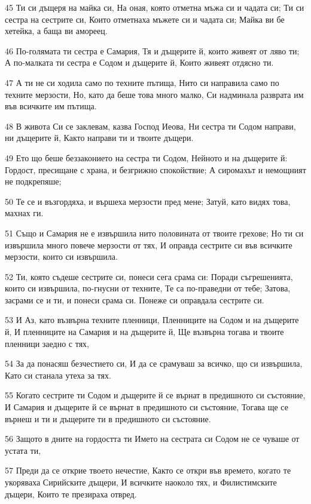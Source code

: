 \par 45 Ти си дъщеря на майка си, На оная, която отметна мъжа си и чадата си; Ти си сестра на сестрите си, Които отметнаха мъжете си и чадата си; Майка ви бе хетейка, а баща ви амореец.
\par 46 По-голямата ти сестра е Самария, Тя и дъщерите й, които живеят от ляво ти; А по-малката ти сестра е Содом и дъщерите й, Които живеят отдясно ти.
\par 47 А ти не си ходила само по техните пътища, Нито си направила само по техните мерзости, Но, като да беше това много малко, Си надминала разврата им във всичките им пътища.
\par 48 В живота Си се заклевам, казва Господ Иеова, Ни сестра ти Содом направи, ни дъщерите й, Както направи ти и твоите дъщери.
\par 49 Ето що беше беззаконието на сестра ти Содом, Нейното и на дъщерите й: Гордост, пресищане с храна, и безгрижно спокойствие; А сиромахът и немощният не подкрепяше;
\par 50 Те се и възгордяха, и вършеха мерзости пред мене; Затуй, като видях това, махнах ги.
\par 51 Също и Самария не е извършила нито половината от твоите грехове; Но ти си извършила много повече мерзости от тях, И оправда сестрите си във всичките мерзости, които си извършила.
\par 52 Ти, която съдеше сестрите си, понеси сега срама си: Поради съгрешенията, които си извършила, по-гнусни от техните, Те са по-праведни от тебе; Затова, засрами се и ти, и понеси срама си. Понеже си оправдала сестрите си.
\par 53 И Аз, като възвърна техните пленници, Пленниците на Содом и на дъщерите й, И пленниците на Самария и на дъщерите й, Ще възвърна тогава и твоите пленници заедно с тях,
\par 54 За да понасяш безчестието си, И да се срамуваш за всичко, що си извършила, Като си станала утеха за тях.
\par 55 Когато сестрите ти Содом и дъщерите й се върнат в предишното си състояние, И Самария и дъщерите й се върнат в предишното си състояние, Тогава ще се върнеш и ти и дъщерите ти в предишното си състояние.
\par 56 Защото в дните на гордостта ти Името на сестрата си Содом не се чуваше от устата ти,
\par 57 Преди да се открие твоето нечестие, Както се откри във времето, когато те укоряваха Сирийските дъщери, И всичките наоколо тях, и Филистимските дъщери, Които те презираха отвред.
